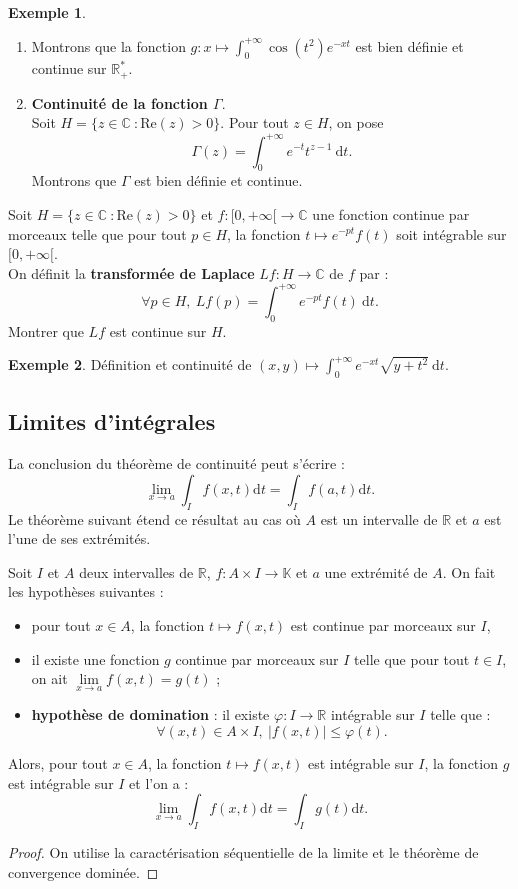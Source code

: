\documentclass[french]{article}
\newcommand{\R}{\mathbb{R}}
\newcommand{\C}{\mathbb{C}}
\newcommand{\K}{\mathbb{K}}
\newcommand{\st}{^*}
\renewcommand{\d}{\text{d}}
\theoremstyle{plain}
\theoremstyle{definition}
\newtheorem*{ex}{Exemple}
\theoremstyle{remark}
\begin{document}
\begin{ex}
	\begin{enumerate}
		\item Montrons que la fonction $g:x\mapsto\displaystyle\int_{0}^{+\infty}\cos(t^2)e^{-xt}$ est bien définie et continue sur $\R_+\st$.
		\item \textbf{Continuité de la fonction $\Gamma$}.\\
		Soit $H=\{z\in\C\ : \text{Re}(z)>0\}$. Pour tout $z\in H$, on pose $$\Gamma(z)=\int_{0}^{+\infty}e^{-t}t^{z-1}\ \d t.$$ Montrons que $\Gamma$ est bien définie et continue.
	\end{enumerate}
\end{ex}

\begin{exo}
	Soit $H=\{z\in\C\ : \text{Re}(z)>0\}$ et $f:[0,+\infty[\to\C$ une fonction continue par morceaux telle que pour tout $p\in H$, la fonction $t\mapsto e^{-pt}f(t)$ soit intégrable sur $[0,+\infty[$. \\
	On définit la \textbf{transformée de Laplace} $Lf:H\to\C$ de $f$ par : $$\forall p\in H,\ Lf(p)=\int_{0}^{+\infty}e^{-pt}f(t)\ \d t.$$ Montrer que $Lf$ est continue sur $H$.
\end{exo}

\begin{ex}
	Définition et continuité de $(x,y)\mapsto\displaystyle\int_{0}^{+\infty}e^{-xt}\sqrt{y+t^2}\ \d t.$
\end{ex}

\subsection{Limites d'intégrales}

La conclusion du théorème de continuité peut s'écrire : $$\underset{x\to a}{\lim}\int_I f(x,t) \d t=\int_I f(a,t)\d t.$$ Le théorème suivant étend ce résultat au cas où $A$ est un intervalle de $\R$ et $a$ est l'une de ses extrémités.

\begin{prop}
	Soit $I$ et $A$ deux intervalles de $\R$, $f:A\times I\to\K$ et $a$ une extrémité de $A$. On fait les hypothèses suivantes :
	\begin{itemize}
		\item pour tout $x\in A$, la fonction $t\mapsto f(x,t)$ est continue par morceaux sur $I$,
		\item il existe une fonction $g$ continue par morceaux sur $I$ telle que pour tout $t\in I$, on ait $\underset{x\to a}{\lim}f(x,t)=g(t)$ ;
		\item \textbf{hypothèse de domination} : il existe $\varphi:I\to\R$ intégrable sur $I$ telle que :
		$$\forall (x,t)\in A\times I,\ \lvert f(x,t)\rvert\leqslant\varphi(t).$$
	\end{itemize}
	Alors, pour tout $x\in A$, la fonction $t\mapsto f(x,t)$ est intégrable sur $I$, la fonction $g$ est intégrable sur $I$ et l'on a :
	$$\underset{x\to a}{\lim}\int_I f(x,t)\d t=\int_I g(t)\d t.$$
\end{prop}
\begin{proof}
	On utilise la caractérisation séquentielle de la limite et le théorème de convergence dominée.
\end{proof}
\end{document}
